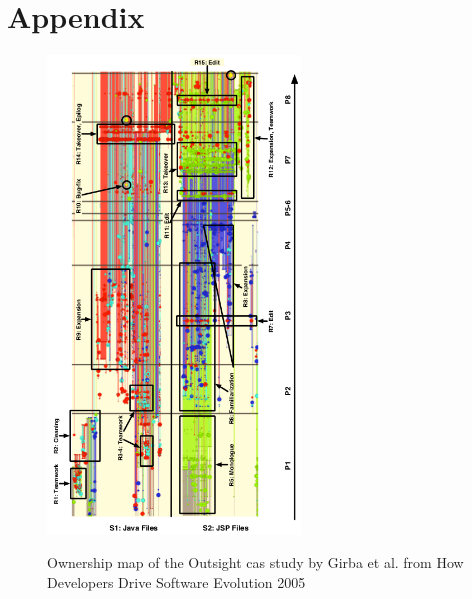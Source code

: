 \onecolumn
\makeatletter
\setlength{\@fptop}{0pt plus 1fil}
\setlength{\@fpbot}{0pt plus 1fil}
\makeatletter

\section{Appendix}

\begin{figure}[H]
\centering
\includegraphics[width=0.6\textwidth]{./resources/annex_outsight.png}~
\caption{Ownership map of the Outsight cas study by Girba et al. from How Developers Drive Software Evolution 2005}
\label{fig:annex_ownership_outsight}
\end{figure}

